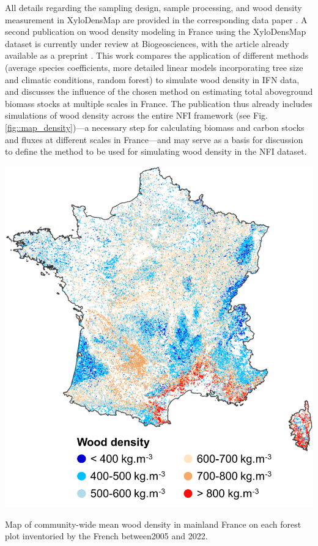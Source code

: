 All details regarding the sampling design, sample processing, and wood density measurement in Xylo\-Dens\-Map are provided in the corresponding data paper \parencite{Cuny2025}. A second publication on wood density modeling in France using the Xylo\-Dens\-Map dataset is currently under review at Biogeosciences, with the article already available as a preprint \parencite{Cuny2025_a}. This work compares the application of different methods (average species coefficients, more detailed linear models incorporating tree size and climatic conditions, random forest) to simulate wood density in IFN data, and discusses the influence of the chosen method on estimating total aboveground biomass stocks at multiple scales in France. The publication thus already includes simulations of wood density across the entire NFI framework (see Fig.  \ref{fig::map_density})---a necessary step for calculating biomass and carbon stocks and fluxes at different scales in France---and may serve as a basis for discussion to define the method to be used for simulating wood density in the NFI dataset.
\begin{marginfigure}[-4cm]
	\includegraphics[width = \marginparwidth]{./Figures/map_density.png}
	\caption{Map of community-wide mean wood density in mainland France on each forest plot inventoried by the French \NFI{} between2005 and 2022.\label{fig::map_density}}
\end{marginfigure}
